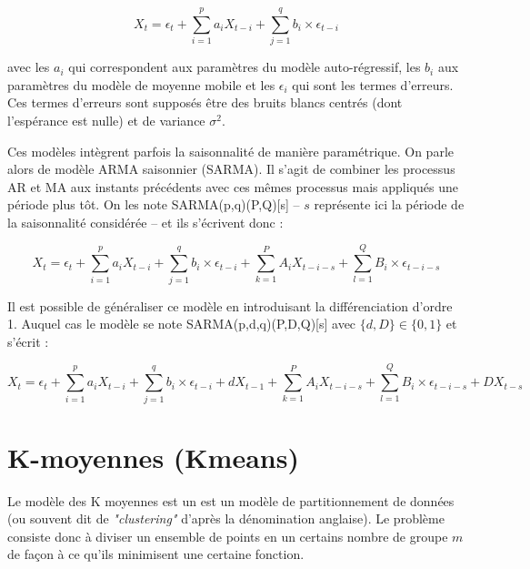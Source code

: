 \documentclass[12pt, french]{report}
\begin{document}
\begin{equation}
	X_t = \epsilon_t + \sum_{i = 1}^{p} a_i X_{t-i} + \sum_{j = 1}^{q} b_i \times \epsilon_{t-i}
\end{equation}

avec les $a_i$ qui correspondent aux paramètres du modèle auto-régressif, les $b_i$ aux paramètres du modèle de moyenne mobile et les $\epsilon_i$ qui sont les termes d'erreurs. Ces termes d'erreurs sont supposés être des bruits blancs centrés (dont l'espérance est nulle) et de variance $\sigma^2$.

Ces modèles intègrent parfois la saisonnalité de manière paramétrique. On parle alors de modèle ARMA saisonnier (SARMA). Il s'agit de combiner les processus AR et MA aux instants précédents avec ces mêmes processus mais appliqués une période plus tôt. On les note SARMA(p,q)(P,Q)[s] --  $s$ représente ici la période de la saisonnalité considérée -- et ils s'écrivent donc :

\begin{equation}
X_t = \epsilon_t + \sum_{i = 1}^{p} a_i X_{t-i} + \sum_{j = 1}^{q} b_i \times \epsilon_{t-i} + \sum_{k = 1}^{P} A_i X_{t-i-s} + \sum_{l = 1}^{Q} B_i \times \epsilon_{t-i-s}
\end{equation}

Il est possible de généraliser ce modèle en introduisant la différenciation d'ordre 1. Auquel cas le modèle se note SARMA(p,d,q)(P,D,Q)[s] avec $\{ d,D\} \in \{0,1\}$ et s'écrit :

\begin{equation}
X_t = \epsilon_t + \sum_{i = 1}^{p} a_i X_{t-i} + \sum_{j = 1}^{q} b_i \times \epsilon_{t-i} + d X_{t-1} +  \sum_{k = 1}^{P} A_i X_{t-i-s} + \sum_{l = 1}^{Q} B_i \times \epsilon_{t-i-s} + D X_{t-s}
\end{equation}


\section{K-moyennes (Kmeans)}
\label{sec:Kmeans}

Le modèle des K moyennes est un est un modèle de partitionnement de données (ou souvent dit de \textit{"clustering"} d'après la dénomination anglaise). Le problème consiste donc à diviser un ensemble de points en un certains nombre de groupe $m$ de façon à ce qu'ils minimisent une certaine fonction.
\end{document}
